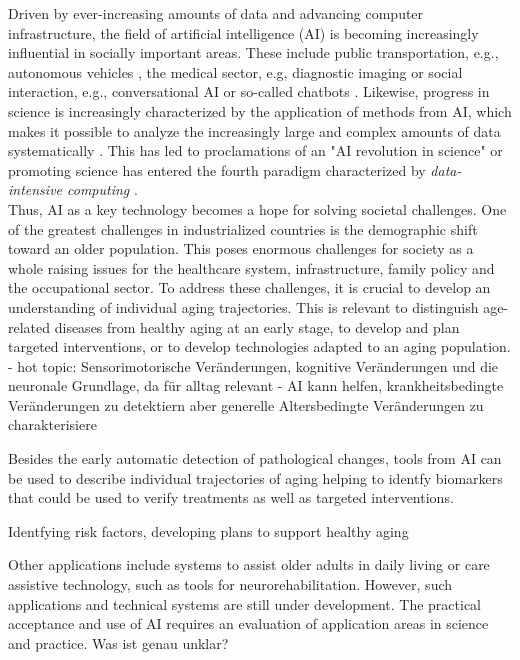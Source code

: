 Driven by ever-increasing amounts of data and advancing computer infrastructure, the field of artificial intelligence (AI) is becoming increasingly influential in socially important areas. These include public transportation, e.g., autonomous vehicles \cite{Leonard2020}, the medical sector, e.g, diagnostic imaging \cite{Liu2020} or social interaction, e.g., conversational AI or so-called chatbots \cite{Adamopoulou2020}. Likewise, progress in science is increasingly characterized by the application of methods from AI, which makes it possible to analyze the increasingly large and complex amounts of data systematically \cite{Brunton2019}. This has led to proclamations of an "AI revolution in science" \cite{Appenzeller2017} or promoting science has entered the fourth paradigm characterized by \textit{data-intensive computing} \cite{Hey2009}.\\
Thus, AI as a key technology becomes a hope for solving societal challenges. One of the greatest challenges in industrialized countries is the demographic shift toward an older population. This poses enormous challenges for society as a whole raising issues for the healthcare system, infrastructure, family policy and the occupational sector. 
To address these challenges, it is crucial to develop an understanding of individual aging trajectories. This is relevant to distinguish age-related diseases from healthy aging at an early stage, to develop and plan targeted interventions, or to develop technologies adapted to an aging population. 
- hot topic: Sensorimotorische Veränderungen, kognitive Veränderungen und die neuronale Grundlage, da für alltag relevant 
- AI kann helfen, krankheitsbedingte Veränderungen zu detektiern aber generelle Altersbedingte Veränderungen zu charakterisiere 

Besides the early automatic detection of pathological changes, tools from AI can be used to describe individual trajectories of aging helping to identfy biomarkers that could be used to verify treatments as well as targeted interventions.



Identfying risk factors, developing plans to support healthy aging 

 Other applications include systems to assist older adults in daily living or care assistive technology, such as tools for neurorehabilitation. However, such applications and technical systems are still under development. The practical acceptance and use of AI requires an evaluation of application areas in science and practice. 
Was ist genau unklar? 


